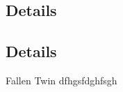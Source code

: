 \smallskip

\subsection*{Details} 

\smallskip

\subsection*{Details} 

\smallskip


\begin{DndSidebar}{Fallen Twin}
 dfhgsfdghfsgh
\end{DndSidebar}



\bigskip


\clearpage